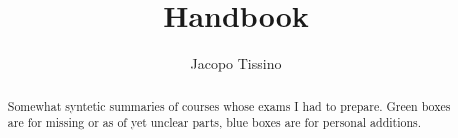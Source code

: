 \documentclass[a4paper, 12pt]{report}
\title{Handbook}
\author{Jacopo Tissino}
\begin{document}
\maketitle

\begin{abstract}
    Somewhat syntetic summaries of courses whose exams I had to prepare.
    Green boxes are for missing or as of yet unclear parts, blue boxes are for  personal additions.
\end{abstract}



\setcounter{tocdepth}{4}
\tableofcontents
\let\tableofcontents\relax






\end{document}

